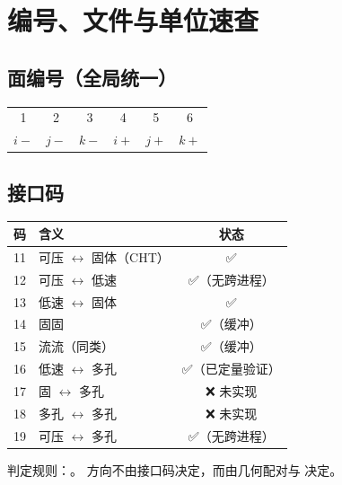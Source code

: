 \section{编号、文件与单位速查}
\label{app:codes}

\subsection{面编号（全局统一）}
\begin{center}
\begin{tabular}{cccccc}
\toprule
1 & 2 & 3 & 4 & 5 & 6 \\
$i-$ & $j-$ & $k-$ & $i+$ & $j+$ & $k+$ \\
\bottomrule
\end{tabular}
\end{center}

\subsection{接口码}
\begin{center}\small
\begin{tabular}{clc}
\toprule
码 & 含义 & 状态 \\
\midrule
11 & 可压 $\leftrightarrow$ 固体（CHT） & ✅ \\
12 & 可压 $\leftrightarrow$ 低速 & ✅（无跨进程）\\
13 & 低速 $\leftrightarrow$ 固体 & ✅ \\
14 & 固固 & ✅（缓冲）\\
15 & 流流（同类） & ✅（缓冲）\\
16 & 低速 $\leftrightarrow$ 多孔 & ✅（已定量验证）\\
17 & 固 $\leftrightarrow$ 多孔 & ❌ 未实现 \\
18 & 多孔 $\leftrightarrow$ 多孔 & ❌ 未实现 \\
19 & 可压 $\leftrightarrow$ 多孔 & ✅（无跨进程）\\
\bottomrule
\end{tabular}
\end{center}
判定规则：。
方向不由接口码决定，而由几何配对与  决定。


